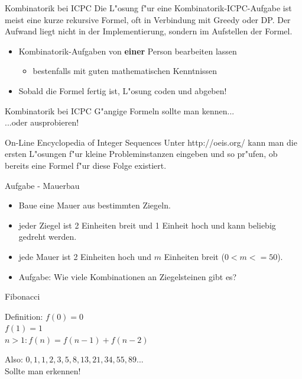 \documentclass[18pt]{beamer}
\begin{document}
\begin{frame}{Kombinatorik bei ICPC}
Die L"osung f"ur eine Kombinatorik-ICPC-Aufgabe ist meist eine kurze rekursive Formel, oft in Verbindung mit Greedy oder DP. Der Aufwand liegt nicht in der Implementierung, sondern im Aufstellen der Formel.
\begin{itemize}
\item Kombinatorik-Aufgaben von \textbf{einer} Person bearbeiten lassen

\begin{itemize}
\item bestenfalls mit guten mathematischen Kenntnissen
\end{itemize}

\item Sobald die Formel fertig ist, L"osung coden und abgeben!
\end{itemize}
\end{frame}

\begin{frame}{Kombinatorik bei ICPC}
G"angige Formeln sollte man kennen... \\
...oder ausprobieren! \\

\begin{block}{On-Line Encyclopedia of Integer Sequences}
Unter http://oeis.org/ kann man die ersten L"osungen f"ur kleine Probleminstanzen eingeben und so pr"ufen, ob bereits eine Formel f"ur diese Folge existiert.
\end{block}
\end{frame}


\begin{frame}{Aufgabe - Mauerbau}
\begin{itemize}
	\item Baue eine Mauer aus bestimmten Ziegeln.
	\item jeder Ziegel ist 2 Einheiten breit und 1 Einheit hoch und kann beliebig gedreht werden.
	\item jede Mauer ist 2 Einheiten hoch und \(m\) Einheiten breit (\(0<m<=50\)). 
	\item Aufgabe: Wie viele Kombinationen an Ziegelsteinen gibt es?
\end{itemize}
\end{frame}


\begin{frame}{Fibonacci}
\begin{block}{Definition:}
\(f(0)=0\)\\
\(f(1)=1\)\\
\(n>1: f(n)=f(n-1)+f(n-2)\)\\
\end{block}
Also: \(0, 1, 1, 2, 3, 5, 8, 13, 21, 34, 55, 89...\)\\

Sollte man erkennen!
\end{frame}
\end{document}
